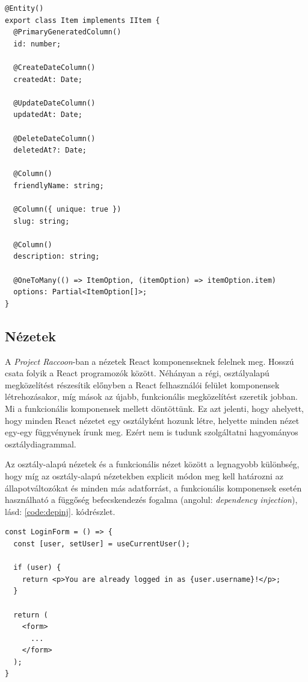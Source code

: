 \pagebreak

\begin{lstlisting}[caption={ Egy modell entitásának megvalósítása }, captionpos=b, language = TS, label={code:modelentity}]
@Entity()
export class Item implements IItem {
  @PrimaryGeneratedColumn()
  id: number;

  @CreateDateColumn()
  createdAt: Date;

  @UpdateDateColumn()
  updatedAt: Date;

  @DeleteDateColumn()
  deletedAt?: Date;

  @Column()
  friendlyName: string;

  @Column({ unique: true })
  slug: string;

  @Column()
  description: string;

  @OneToMany(() => ItemOption, (itemOption) => itemOption.item)
  options: Partial<ItemOption[]>;
}
\end{lstlisting}

\subsection{Nézetek}

A \textit{Project Raccoon}-ban a nézetek React komponenseknek felelnek meg. Hosszú csata folyik a React programozók között. Néhányan a régi, osztályalapú megközelítést részesítik előnyben a React felhasználói felület komponensek létrehozásakor, míg mások az újabb, funkcionális megközelítést szeretik jobban. Mi a funkcionális komponensek mellett döntöttünk. Ez azt jelenti, hogy ahelyett, hogy minden React nézetet egy osztályként hozunk létre, helyette minden nézet egy-egy függvénynek írunk meg. Ezért nem is tudunk szolgáltatni hagyományos osztálydiagrammal.

Az osztály-alapú nézetek és a funkcionális nézet között a legnagyobb különbség, hogy míg az osztály-alapú nézetekben explicit módon meg kell határozni az állapotváltozókat és minden más adatforrást, a funkcionális komponensek esetén használható a függőség befecskendezés fogalma (angolul: \textit{dependency injection}), lásd: \ref{code:depinj}. kódrészlet.

\begin{lstlisting}[caption={ A felhasználó objektum befecskendezése egy React komponensbe }, captionpos=b, language = TS, label={code:depinj}]
const LoginForm = () => {
  const [user, setUser] = useCurrentUser();

  if (user) {
    return <p>You are already logged in as {user.username}!</p>;
  }

  return (
    <form>
      ...
    </form>
  );
}
\end{lstlisting}

